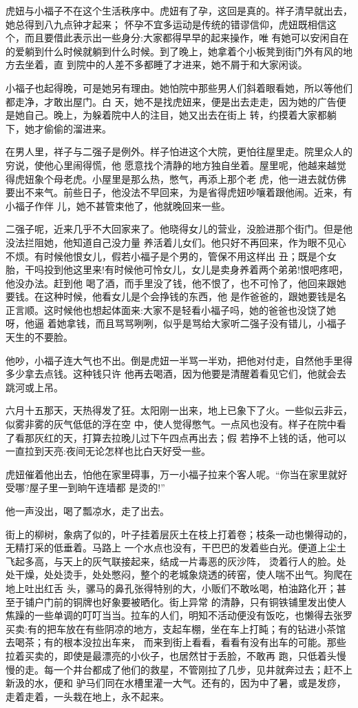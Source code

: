 \documentclass[11pt,a4paper,onecolumn]{article}
\begin{document}
虎妞与小福子不在这个生活秩序中。虎妞有了孕，这回是真的。祥子清早就出去，她总得到八九点钟才起来；
怀孕不宜多运动是传统的错谬信仰，虎妞既相信这个，而且要借此表示出一些身分:大家都得早早的起来操作，唯
有她可以安闲自在的爱躺到什么时候就躺到什么时候。到了晚上，她拿着个小板凳到街门外有风的地方去坐着，直
到院中的人差不多都睡了才进来，她不屑于和大家闲谈。

小福子也起得晚，可是她另有理由。她怕院中那些男人们斜着眼看她，所以等他们都走净，才敢出屋门。白
天，她不是找虎妞来，便是出去走走，因为她的广告便是她自己。晚上，为躲着院中人的注目，她又出去在街上
转，约摸着大家都躺下，她才偷偷的溜进来。

在男人里，祥子与二强子是例外。样子怕进这个大院，更怕往屋里走。院里众人的穷说，使他心里闹得慌，他
愿意找个清静的地方独自坐着。屋里呢，他越来越觉得虎妞象个母老虎。小屋里是那么热，憋气，再添上那个老
虎，他一进去就仿佛要出不来气。前些日子，他没法不早回来，为是省得虎妞吵嚷着跟他闹。近来，有小福子作伴
儿，她不甚管束他了，他就晚回来一些。

二强子呢，近来几乎不大回家来了。他晓得女儿的营业，没脸进那个街门。但是他没法拦阻她，他知道自己没力量
养活着儿女们。他只好不再回来，作为眼不见心不烦。有时候他恨女儿，假若小福子是个男的，管保不用这样出
丑；既是个女胎，干吗投到他这里来!有时候他可怜女儿，女儿是卖身养着两个弟弟!恨吧疼吧，他没办法。赶到他
喝了酒，而手里没了钱，他不恨了，也不可怜了，他回来跟她要钱。在这种时候，他看女儿是个会挣钱的东西，他
是作爸爸的，跟她要钱是名正言顺。这时候他也想起体面来:大家不是轻看小福子吗，她的爸爸也没饶了她呀，他逼
着她拿钱，而且骂骂咧咧，似乎是骂给大家听\myrule 二强子没有错儿，小福子天生的不要脸。

他吵，小福子连大气也不出。倒是虎妞一半骂一半劝，把他对付走，自然他手里得多少拿去点钱。这种钱只许
他再去喝酒，因为他要是清醒着看见它们，他就会去跳河或上吊。

六月十五那天，天热得发了狂。太阳刚一出来，地上已象下了火。一些似云非云，似雾非雾的灰气低低的浮在空
中，使人觉得憋气。一点风也没有。样子在院中看了看那灰红的天，打算去拉晚儿\myrule 过下午四点再出去；假
若挣不上钱的话，他可以一直拉到天亮:夜间无论怎样也比白天好受一些。

虎妞催着他出去，怕他在家里碍事，万一小福子拉来个客人呢。``你当在家里就好受哪?屋子里一到晌午连墙都
是烫的!''

他一声没出，喝了瓢凉水，走了出去。

街上的柳树，象病了似的，叶子挂着层灰土在枝上打着卷；枝条一动也懒得动的，无精打采的低垂着。马路上
一个水点也没有，干巴巴的发着些白光。便道上尘土飞起多高，与天上的灰气联接起来，结成一片毒恶的灰沙阵，
烫着行人的脸。处处干燥，处处烫手，处处憋闷，整个的老城象烧透的砖窑，使人喘不出气。狗爬在地上吐出红舌
头，骡马的鼻孔张得特别的大，小贩们不敢吆喝，柏油路化开；甚至于铺户门前的铜牌也好象要被晒化。街上异常
的清静，只有铜铁铺里发出使人焦躁的一些单调的叮叮当当。拉车的人们，明知不活动便没有饭吃，也懒得去张罗
买卖:有的把车放在有些阴凉的地方，支起车棚，坐在车上打盹；有的钻进小茶馆去喝茶；有的根本没拉出车来，
而来到街上看看，看看有没有出车的可能。那些拉着买卖的，即使是最漂亮的小伙子，也居然甘于丢脸，不敢再
跑，只低着头慢慢的走。每一个井台都成了他们的救星，不管刚拉了几步，见井就奔过去；赶不上新汲的水，便和
驴马们同在水槽里灌一大气。还有的，因为中了暑，或是发痧，走着走着，一头栽在地上，永不起来。
\end{document}
